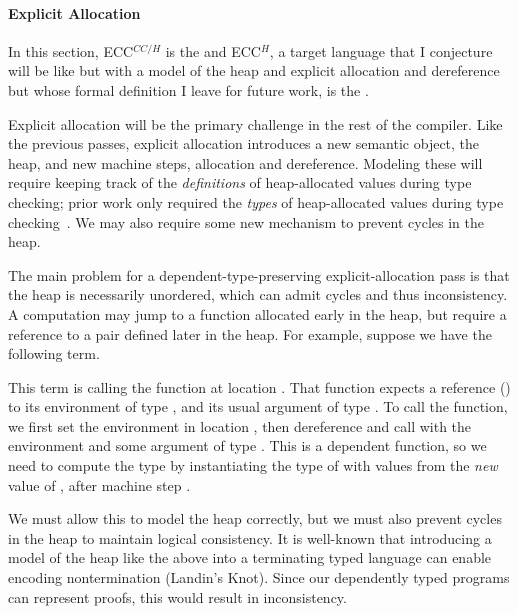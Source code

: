 \paragraph{Explicit Allocation}
\begin{typographical}
  In this section, ECC$^{CC/H}$ is the  and
  ECC$^{H}$,
  a target language that I conjecture will be like \abscctlang but with a model
  of the heap and explicit allocation and dereference but whose formal
  definition I leave for future work, is the .
\end{typographical}

Explicit allocation will be the primary challenge in the rest of the compiler.
Like the previous passes, explicit allocation introduces a new semantic object, the
heap, and new machine steps, allocation and dereference.
Modeling these will require keeping track of the \emph{definitions} of
heap-allocated values during type checking; prior work only required the
\emph{types} of heap-allocated values during type
checking~\cite{morrisett1998:ftotal}.
We may also require some new mechanism to prevent cycles in the heap.

The main problem for a dependent-type-preserving explicit-allocation pass is
that the heap is necessarily unordered, which can admit cycles and thus
inconsistency.
A computation may jump to a function allocated early in the heap, but require a
reference to a pair defined later in the heap.
For example, suppose we have the following term.
\begin{mathpar}
\end{mathpar}
This term is calling the function at location .
That function expects a reference (\tfonttext{\&}) to its environment of type
\im{\tApr}, and its usual argument of type \im{\tA}.
To call the function, we first set the environment in location ,
then dereference and call  with the environment 
and some argument \im{\tepr} of type \im{\tA}.
This is a dependent function, so we need to compute the type \im{\tB} by
instantiating the type of \im{\te} with values from the \emph{new} value of
, after machine step .

We must allow this to model the heap correctly, but we must also prevent cycles
in the heap to maintain logical consistency.
It is well-known that introducing a model of the heap like the above into a
terminating typed language can enable encoding nontermination (Landin's Knot).
Since our dependently typed programs can represent proofs, this would result in
inconsistency.

